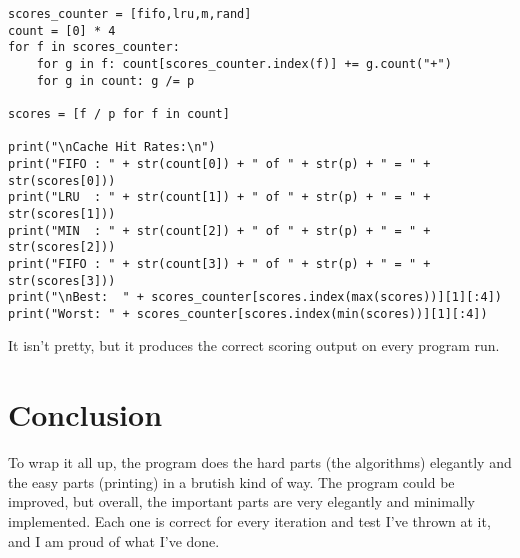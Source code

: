 \documentclass[11pt]{article}
\begin{document}
\begin{lstlisting}
scores_counter = [fifo,lru,m,rand]
count = [0] * 4
for f in scores_counter:
	for g in f: count[scores_counter.index(f)] += g.count("+")
	for g in count: g /= p

scores = [f / p for f in count]

print("\nCache Hit Rates:\n")
print("FIFO : " + str(count[0]) + " of " + str(p) + " = " + str(scores[0]))
print("LRU  : " + str(count[1]) + " of " + str(p) + " = " + str(scores[1]))
print("MIN  : " + str(count[2]) + " of " + str(p) + " = " + str(scores[2]))
print("FIFO : " + str(count[3]) + " of " + str(p) + " = " + str(scores[3]))
print("\nBest:  " + scores_counter[scores.index(max(scores))][1][:4])
print("Worst: " + scores_counter[scores.index(min(scores))][1][:4])
\end{lstlisting}

It isn't pretty, but it produces the correct scoring output on every program run.

\section{Conclusion}

To wrap it all up, the program does the hard parts (the algorithms) elegantly and the easy parts (printing) in a brutish kind of way.
The program could be improved, but overall, the important parts are very elegantly and minimally implemented.
Each one is correct for every iteration and test I've thrown at it, and I am proud of what I've done.
\end{document}
